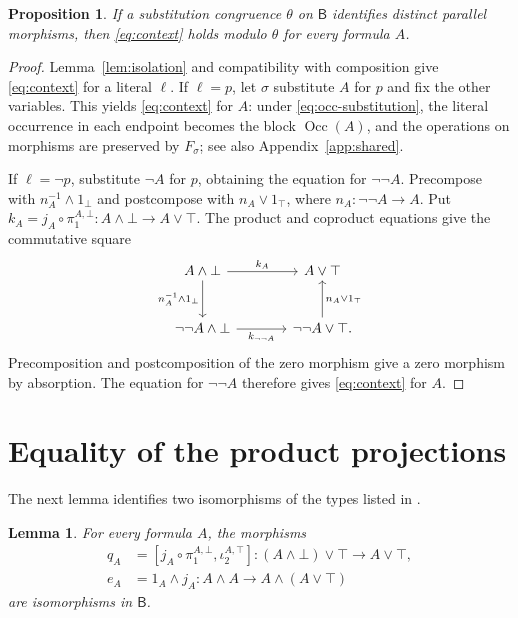 \documentclass[11pt]{article}
\newtheorem{lemma}[theorem]{Lemma}
\newtheorem{proposition}[theorem]{Proposition}
\newcommand{\B}{\mathsf B}
\newcommand{\Occ}{\operatorname{Occ}}
\begin{document}
\begin{proposition}\label{prop:all-contexts}
If a substitution congruence $\theta$ on $\B$ identifies distinct
parallel morphisms, then \eqref{eq:context} holds modulo $\theta$ for
every formula $A$.
\end{proposition}

\begin{proof}
Lemma~\ref{lem:isolation} and compatibility with composition give
\eqref{eq:context} for a literal $\ell$.
If $\ell=p$, let $\sigma$ substitute $A$ for $p$ and fix the other variables.
This yields \eqref{eq:context} for $A$: under
\eqref{eq:occ-substitution}, the literal occurrence in each endpoint
becomes the block $\Occ(A)$, and the operations on morphisms are preserved
by $F_\sigma$; see also Appendix~\ref{app:shared}.

If $\ell=\neg p$, substitute $\neg A$ for $p$, obtaining the equation
for $\neg\neg A$. Precompose with
$n_A^{-1}\wedge1_\bot$ and postcompose with $n_A\vee1_\top$,
where $n_A:\neg\neg A\to A$.
Put
$k_A=j_A\circ\pi_1^{A,\bot}:A\wedge\bot\to A\vee\top$.
The product and coproduct equations give the commutative square
\[
\begin{tikzcd}[column sep=large,row sep=large]
 A\wedge\bot\arrow[r,"k_A"]\arrow[d,"n_A^{-1}\wedge1_\bot"']
   &A\vee\top\\
 \neg\neg A\wedge\bot\arrow[r,"k_{\neg\neg A}"']
   &\neg\neg A\vee\top\arrow[u,"n_A\vee1_\top"'].
\end{tikzcd}
\]
Precomposition and postcomposition of the zero morphism give a zero
morphism by absorption. The equation for $\neg\neg A$ therefore gives
\eqref{eq:context} for $A$.
\end{proof}

\section{Equality of the product projections}\label{sec:collapse}

The next lemma identifies two isomorphisms of the types listed in
\cite[\S12.5, p.~294]{DP}.

\begin{lemma}\label{lem:structural-isos}
For every formula $A$, the morphisms
\[
 \begin{aligned}
 q_A&=[j_A\circ\pi_1^{A,\bot},\iota_2^{A,\top}]
      :(A\wedge\bot)\vee\top\longrightarrow A\vee\top,\\
 e_A&=1_A\wedge j_A
      :A\wedge A\longrightarrow A\wedge(A\vee\top)
 \end{aligned}
\]
are isomorphisms in $\B$.
\end{lemma}
\end{document}
